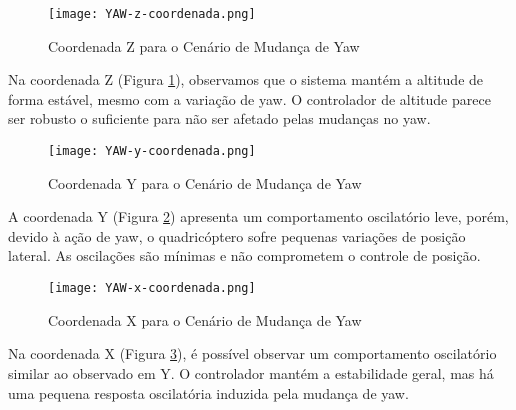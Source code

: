 \begin{figure}[H]
    \centering
    \texttt{[image: YAW-z-coordenada.png]}
    \caption{Coordenada Z para o Cenário de Mudança de Yaw}
    \label{fig:YAW-z-coordenada}
\end{figure}

Na coordenada Z (Figura \ref{fig:YAW-z-coordenada}), observamos que o sistema mantém a altitude de forma estável, mesmo com a variação de yaw. O controlador de altitude parece ser robusto o suficiente para não ser afetado pelas mudanças no yaw.

\begin{figure}[H]
    \centering
    \texttt{[image: YAW-y-coordenada.png]}
    \caption{Coordenada Y para o Cenário de Mudança de Yaw}
    \label{fig:YAW-y-coordenada}
\end{figure}

A coordenada Y (Figura \ref{fig:YAW-y-coordenada}) apresenta um comportamento oscilatório leve, porém, devido à ação de yaw, o quadricóptero sofre pequenas variações de posição lateral. As oscilações são mínimas e não comprometem o controle de posição.

\begin{figure}[H]
    \centering
    \texttt{[image: YAW-x-coordenada.png]}
    \caption{Coordenada X para o Cenário de Mudança de Yaw}
    \label{fig:YAW-x-coordenada}
\end{figure}

Na coordenada X (Figura \ref{fig:YAW-x-coordenada}), é possível observar um comportamento oscilatório similar ao observado em Y. O controlador mantém a estabilidade geral, mas há uma pequena resposta oscilatória induzida pela mudança de yaw.




\printindex
